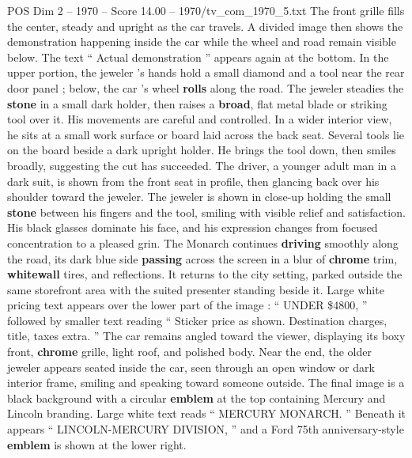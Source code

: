 \begin{textsample}{POS Dim 2 – 1970 – Score 14.00 – 1970/tv\_com\_1970\_5.txt}
The front grille fills the center, steady and upright as the car travels.
A divided image then shows the demonstration happening inside the car while the wheel and road remain visible below.
The text “ Actual demonstration ” appears again at the bottom.
In the upper portion, the jeweler ’s hands hold a small diamond and a tool near the rear door panel ; below, the car ’s wheel \textbf{rolls} along the road.
The jeweler steadies the \textbf{stone} in a small dark holder, then raises a \textbf{broad}, flat metal blade or striking tool over it.
His movements are careful and controlled.
In a wider interior view, he sits at a small work surface or board laid across the back seat.
Several tools lie on the board beside a dark upright holder.
He brings the tool down, then smiles broadly, suggesting the cut has succeeded.
The driver, a younger adult man in a dark suit, is shown from the front seat in profile, then glancing back over his shoulder toward the jeweler.
The jeweler is shown in close-up holding the small \textbf{stone} between his fingers and the tool, smiling with visible relief and satisfaction.
His black glasses dominate his face, and his expression changes from focused concentration to a pleased grin.
The Monarch continues \textbf{driving} smoothly along the road, its dark blue side \textbf{passing} across the screen in a blur of \textbf{chrome} trim, \textbf{whitewall} tires, and reflections.
It returns to the city setting, parked outside the same storefront area with the suited presenter standing beside it.
Large white pricing text appears over the lower part of the image : “ UNDER \$4800, ” followed by smaller text reading “ Sticker price as shown.
Destination charges, title, taxes extra. ” The car remains angled toward the viewer, displaying its boxy front, \textbf{chrome} grille, light roof, and polished body.
Near the end, the older jeweler appears seated inside the car, seen through an open window or dark interior frame, smiling and speaking toward someone outside.
The final image is a black background with a circular \textbf{emblem} at the top containing Mercury and Lincoln branding.
Large white text reads “ MERCURY MONARCH. ” Beneath it appears “ LINCOLN-MERCURY DIVISION, ” and a Ford 75th anniversary-style \textbf{emblem} is shown at the lower right.

\end{textsample}
